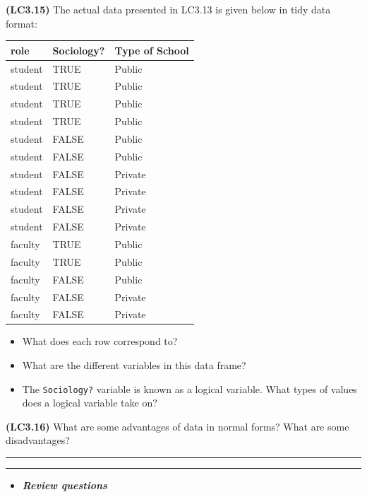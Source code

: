\documentclass[]{tufte-book}
\let\oldrule=\rule
\renewcommand{\rule}[1]{\oldrule{\linewidth}}
\providecommand{\tightlist}{%
  \setlength{\itemsep}{0pt}\setlength{\parskip}{0pt}}
\newenvironment{rmdblock}[1]
  {\begin{shaded*}
  \begin{itemize}
  \renewcommand{\labelitemi}{
    \raisebox{-.7\height}[0pt][0pt]{
    }
  }
  \item
  }
  {
  \end{itemize}
  \end{shaded*}
  }
\newenvironment{review}
  {\begin{rmdblock}{warning}}
  {\end{rmdblock}}
\theoremstyle{definition}
\theoremstyle{definition}
\theoremstyle{remark}
\begin{document}
\textbf{(LC3.15)} The actual data presented in LC3.13 is given below in
tidy data format:

\begin{tabular}{l|l|l}
\hline
role & Sociology? & Type of School\\
\hline
student & TRUE & Public\\
\hline
student & TRUE & Public\\
\hline
student & TRUE & Public\\
\hline
student & TRUE & Public\\
\hline
student & FALSE & Public\\
\hline
student & FALSE & Public\\
\hline
student & FALSE & Private\\
\hline
student & FALSE & Private\\
\hline
student & FALSE & Private\\
\hline
student & FALSE & Private\\
\hline
faculty & TRUE & Public\\
\hline
faculty & TRUE & Public\\
\hline
faculty & FALSE & Public\\
\hline
faculty & FALSE & Private\\
\hline
faculty & FALSE & Private\\
\hline
\end{tabular}

\begin{itemize}
\tightlist
\item
  What does each row correspond to?\\
\item
  What are the different variables in this data frame?\\
\item
  The \texttt{Sociology?} variable is known as a logical variable. What
  types of values does a logical variable take on?
\end{itemize}

\textbf{(LC3.16)} What are some advantages of data in normal forms? What
are some disadvantages?

\begin{center}\rule{0.5\linewidth}{\linethickness}\end{center}

\begin{center}\rule{0.5\linewidth}{\linethickness}\end{center}

\begin{review}
\textbf{\emph{Review questions}}
\end{review}
\end{document}

